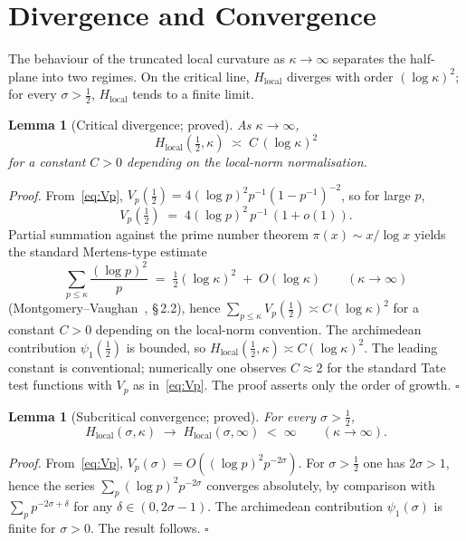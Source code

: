 \documentclass[11pt]{article}
\newtheorem{lemma}[theorem]{Lemma}
\newcommand{\Hlocal}{H_{\mathrm{local}}}
\begin{document}
\section{Divergence and Convergence}
\label{sec:divergence}

The behaviour of the truncated local curvature as
$\kappa\to\infty$ separates the half-plane into two regimes.
On the critical line, $\Hlocal$ diverges with order
$(\log\kappa)^{2}$; for every $\sigma>\tfrac12$, $\Hlocal$
tends to a finite limit.

\begin{lemma}[Critical divergence; proved]
\label{lem:critical-div}
As $\kappa\to\infty$,
\[
\Hlocal(\tfrac12,\kappa)
\;\asymp\;C\,(\log\kappa)^{2}
\]
for a constant $C>0$ depending on the local-norm
normalisation.
\end{lemma}

\emph{Proof.}
From~\eqref{eq:Vp},
$V_p(\tfrac12)=4(\log p)^{2}p^{-1}(1-p^{-1})^{-2}$, so for
large $p$,
\[
V_p(\tfrac12)\;=\;4(\log p)^{2}\,p^{-1}\,(1+o(1)).
\]
Partial summation against the prime number theorem
$\pi(x)\sim x/\log x$ yields the standard Mertens-type
estimate
\[
\sum_{p\le\kappa}\frac{(\log p)^{2}}{p}
\;=\;\tfrac{1}{2}(\log\kappa)^{2}\;+\;O(\log\kappa)
\qquad(\kappa\to\infty)
\]
(Montgomery--Vaughan~\cite{MontgomeryVaughan}, \S\,2.2),
hence
$\sum_{p\le\kappa}V_p(\tfrac12)\asymp C(\log\kappa)^{2}$
for a constant $C>0$ depending on the local-norm convention.
The archimedean contribution $\psi_1(\tfrac12)$ is bounded,
so $\Hlocal(\tfrac12,\kappa)\asymp C(\log\kappa)^{2}$.
The leading constant is conventional; numerically one
observes $C\approx 2$ for the standard Tate test functions
with $V_p$ as in~\eqref{eq:Vp}.
The proof asserts only the order of growth.
\hfill$\square$

\begin{lemma}[Subcritical convergence; proved]
\label{lem:subcrit-conv}
For every $\sigma>\tfrac12$,
\[
\Hlocal(\sigma,\kappa)
\;\to\;\Hlocal(\sigma,\infty)\;<\;\infty
\qquad(\kappa\to\infty).
\]
\end{lemma}

\emph{Proof.}
From~\eqref{eq:Vp},
$V_p(\sigma)=O((\log p)^{2}p^{-2\sigma})$.
For $\sigma>\tfrac12$ one has $2\sigma>1$, hence the series
$\sum_{p}(\log p)^{2}p^{-2\sigma}$ converges absolutely, by
comparison with $\sum_p p^{-2\sigma+\delta}$ for any
$\delta\in(0,2\sigma-1)$.
The archimedean contribution $\psi_1(\sigma)$ is finite for
$\sigma>0$.
The result follows.
\hfill$\square$
\end{document}
